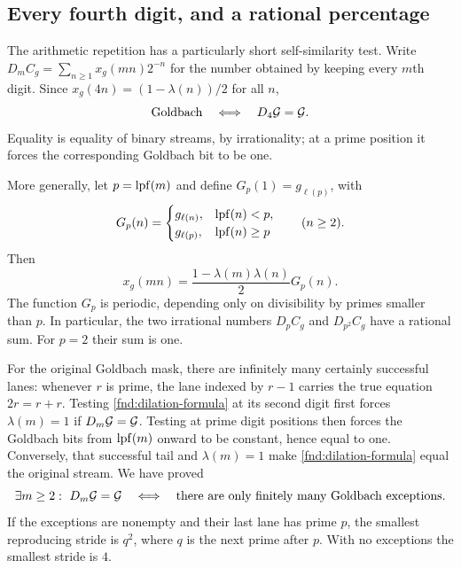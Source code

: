 \subsection{Every fourth digit, and a rational percentage}

The arithmetic repetition has a particularly short self-similarity
test.  Write $D_mC_g=\sum_{n\ge1}x_g(mn)2^{-n}$ for the number
obtained by keeping every $m$th digit.  Since
$x_g(4n)=(1-\lambda(n))/2$ for all $n$,
\begin{equation}
 \mathrm{Goldbach}\quad\Longleftrightarrow\quad D_4\mathcal G=\mathcal G.
 \label{fnd:every-fourth}
\end{equation}
Equality is equality of binary streams, by irrationality; at a prime
position it forces the corresponding Goldbach bit to be one.

More generally, let $p=\operatorname{lpf}(m)$ and define $G_p(1)=g_{\ell(p)}$,
with
\[
 G_p(n)=
 \begin{cases}
  g_{\ell(n)},&\operatorname{lpf}(n)<p,\\
  g_{\ell(p)},&\operatorname{lpf}(n)\ge p
 \end{cases}\qquad(n\ge2).
\]
Then
\begin{equation}
 x_g(mn)=\frac{1-\lambda(m)\lambda(n)}2G_p(n).
 \label{fnd:dilation-formula}
\end{equation}
The function $G_p$ is periodic, depending only on divisibility by
primes smaller than $p$.  In particular, the two irrational numbers
$D_pC_g$ and $D_{p^2}C_g$ have a rational sum.  For $p=2$ their
sum is one.

For the original Goldbach mask, there are infinitely many certainly
successful lanes: whenever $r$ is prime, the lane indexed by $r-1$
carries the true equation $2r=r+r$.  Testing
\eqref{fnd:dilation-formula} at its second digit first forces
$\lambda(m)=1$ if $D_m\mathcal G=\mathcal G$.  Testing at prime digit positions then
forces the Goldbach bits from $\operatorname{lpf}(m)$ onward to be constant,
hence equal to one.  Conversely, that successful tail and
$\lambda(m)=1$ make \eqref{fnd:dilation-formula} equal the original
stream.  We have proved
\begin{equation}
 \exists m\ge2:\ D_m\mathcal G=\mathcal G
 \quad\Longleftrightarrow\quad
 \text{there are only finitely many Goldbach exceptions}.
 \label{fnd:finite-exception-selfsimilarity}
\end{equation}
If the exceptions are nonempty and their last lane has prime $p$,
the smallest reproducing stride is $q^2$, where $q$ is the next
prime after $p$.  With no exceptions the smallest stride is $4$.

